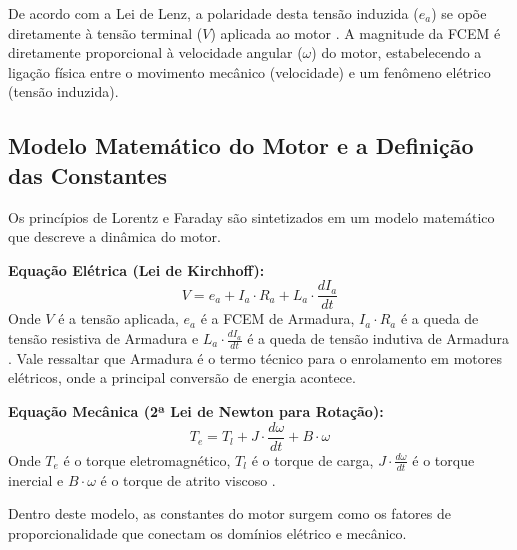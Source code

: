 De acordo com a Lei de Lenz, a polaridade desta tensão induzida ($e_a$) se opõe diretamente à tensão terminal ($V$) aplicada ao motor \parencite{infineon2011bldc}. A magnitude da FCEM é diretamente proporcional à velocidade angular ($\omega$) do motor, estabelecendo a ligação física entre o movimento mecânico (velocidade) e um fenômeno elétrico (tensão induzida).

\subsection{Modelo Matemático do Motor e a Definição das Constantes}

Os princípios de Lorentz e Faraday são sintetizados em um modelo matemático que descreve a dinâmica do motor.

\textbf{Equação Elétrica (Lei de Kirchhoff):}
\begin{equation}
    V = e_a + I_a \cdot R_a + L_a \cdot \frac{dI_a}{dt}
\end{equation}
Onde $V$ é a tensão aplicada, $e_a$ é a FCEM de Armadura, $I_a \cdot R_a$ é a queda de tensão resistiva de Armadura e $L_a \cdot \frac{dI_a}{dt}$ é a queda de tensão indutiva de Armadura \parencite{maquinasEletricasFitzgerald}. Vale ressaltar que Armadura é o termo técnico para o enrolamento em motores elétricos, onde a principal conversão de energia acontece.

\textbf{Equação Mecânica (2ª Lei de Newton para Rotação):}
\begin{equation}
    T_e = T_l + J \cdot \frac{d\omega}{dt} + B \cdot \omega
\end{equation}
Onde $T_e$ é o torque eletromagnético, $T_l$ é o torque de carga, $J \cdot \frac{d\omega}{dt}$ é o torque inercial e $B \cdot \omega$ é o torque de atrito viscoso \parencite{maquinasEletricasFitzgerald}.

Dentro deste modelo, as constantes do motor surgem como os fatores de proporcionalidade que conectam os domínios elétrico e mecânico.

